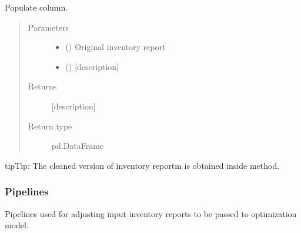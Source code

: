 \documentclass[letterpaper,10pt,english]{sphinxmanual}
\begin{document}
\begin{fulllineitems}
\label{\detokenize{source/optimization.datatools:optimization.datatools.extra_output.transfer_reason}}
Populate  column.
\begin{quote}\begin{description}
\item[{Parameters}] \leavevmode\begin{itemize}
\item {} 
 () \textendash{} Original inventory report 

\item {} 
 () \textendash{} {[}description{]}

\end{itemize}

\item[{Returns}] \leavevmode
{[}description{]}

\item[{Return type}] \leavevmode
pd.DataFrame

\end{description}\end{quote}

\begin{sphinxadmonition}{tip}{Tip:}
The cleaned version of inventory reportm is obtained inside {\hyperref[\detokenize{source/optimization.model:optimization.model.main.main}]{}} method.
\end{sphinxadmonition}

\end{fulllineitems}



\subsubsection{Pipelines}
\label{\detokenize{source/optimization.datatools:module-optimization.datatools.pipelines}}\label{\detokenize{source/optimization.datatools:pipelines}}
Pipelines used for adjusting input inventory reports to be passed to optimization model.
\end{document}
